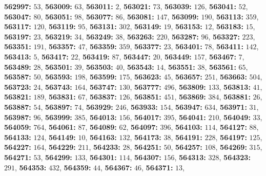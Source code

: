 \textsf{\bfseries 562997:} $53$, \textsf{\bfseries 563009:} $63$, \textsf{\bfseries 563011:} $2$, \textsf{\bfseries 563021:} $73$, \textsf{\bfseries 563039:} $126$, \textsf{\bfseries 563041:} $52$, \textsf{\bfseries 563047:} $80$, \textsf{\bfseries 563051:} $98$, \textsf{\bfseries 563077:} $86$, \textsf{\bfseries 563081:} $147$, \textsf{\bfseries 563099:} $190$, \textsf{\bfseries 563113:} $359$, \textsf{\bfseries 563117:} $120$, \textsf{\bfseries 563119:} $95$, \textsf{\bfseries 563131:} $302$, \textsf{\bfseries 563149:} $19$, \textsf{\bfseries 563153:} $12$, \textsf{\bfseries 563183:} $15$, \textsf{\bfseries 563197:} $23$, \textsf{\bfseries 563219:} $34$, \textsf{\bfseries 563249:} $38$, \textsf{\bfseries 563263:} $220$, \textsf{\bfseries 563287:} $96$, \textsf{\bfseries 563327:} $223$, \textsf{\bfseries 563351:} $191$, \textsf{\bfseries 563357:} $47$, \textsf{\bfseries 563359:} $359$, \textsf{\bfseries 563377:} $23$, \textsf{\bfseries 563401:} $78$, \textsf{\bfseries 563411:} $142$, \textsf{\bfseries 563413:} $5$, \textsf{\bfseries 563417:} $22$, \textsf{\bfseries 563419:} $87$, \textsf{\bfseries 563447:} $20$, \textsf{\bfseries 563449:} $157$, \textsf{\bfseries 563467:} $7$, \textsf{\bfseries 563489:} $28$, \textsf{\bfseries 563501:} $39$, \textsf{\bfseries 563503:} $40$, \textsf{\bfseries 563543:} $14$, \textsf{\bfseries 563551:} $38$, \textsf{\bfseries 563561:} $65$, \textsf{\bfseries 563587:} $50$, \textsf{\bfseries 563593:} $198$, \textsf{\bfseries 563599:} $175$, \textsf{\bfseries 563623:} $45$, \textsf{\bfseries 563657:} $251$, \textsf{\bfseries 563663:} $504$, \textsf{\bfseries 563723:} $24$, \textsf{\bfseries 563743:} $164$, \textsf{\bfseries 563747:} $130$, \textsf{\bfseries 563777:} $496$, \textsf{\bfseries 563809:} $133$, \textsf{\bfseries 563813:} $41$, \textsf{\bfseries 563821:} $189$, \textsf{\bfseries 563831:} $67$, \textsf{\bfseries 563837:} $126$, \textsf{\bfseries 563851:} $451$, \textsf{\bfseries 563869:} $384$, \textsf{\bfseries 563881:} $26$, \textsf{\bfseries 563887:} $54$, \textsf{\bfseries 563897:} $74$, \textsf{\bfseries 563929:} $246$, \textsf{\bfseries 563933:} $154$, \textsf{\bfseries 563947:} $634$, \textsf{\bfseries 563971:} $31$, \textsf{\bfseries 563987:} $96$, \textsf{\bfseries 563999:} $385$, \textsf{\bfseries 564013:} $156$, \textsf{\bfseries 564017:} $395$, \textsf{\bfseries 564041:} $210$, \textsf{\bfseries 564049:} $33$, \textsf{\bfseries 564059:} $764$, \textsf{\bfseries 564061:} $87$, \textsf{\bfseries 564089:} $62$, \textsf{\bfseries 564097:} $396$, \textsf{\bfseries 564103:} $114$, \textsf{\bfseries 564127:} $88$, \textsf{\bfseries 564133:} $124$, \textsf{\bfseries 564149:} $10$, \textsf{\bfseries 564163:} $132$, \textsf{\bfseries 564173:} $38$, \textsf{\bfseries 564191:} $228$, \textsf{\bfseries 564197:} $125$, \textsf{\bfseries 564227:} $164$, \textsf{\bfseries 564229:} $211$, \textsf{\bfseries 564233:} $28$, \textsf{\bfseries 564251:} $50$, \textsf{\bfseries 564257:} $108$, \textsf{\bfseries 564269:} $315$, \textsf{\bfseries 564271:} $53$, \textsf{\bfseries 564299:} $133$, \textsf{\bfseries 564301:} $114$, \textsf{\bfseries 564307:} $156$, \textsf{\bfseries 564313:} $328$, \textsf{\bfseries 564323:} $291$, \textsf{\bfseries 564353:} $432$, \textsf{\bfseries 564359:} $44$, \textsf{\bfseries 564367:} $46$, \textsf{\bfseries 564371:} $13$, 
